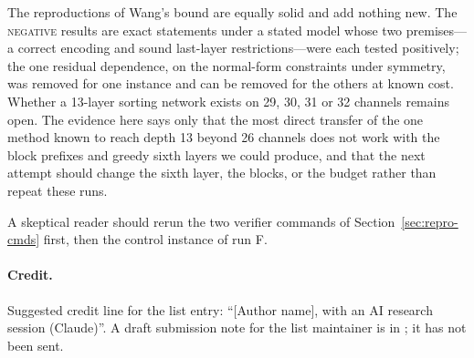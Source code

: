 \documentclass[11pt,a4paper]{article}
\theoremstyle{plain}
\theoremstyle{definition}
\theoremstyle{remark}
\newcommand{\NEG}{\textsc{negative}}
\begin{document}
The reproductions of Wang's bound are equally solid and add nothing new. The \NEG{} results are exact statements under a stated model whose two premises---a correct encoding and sound last-layer restrictions---were each tested positively; the one residual dependence, on the normal-form constraints under symmetry, was removed for one instance and can be removed for the others at known cost. Whether a 13-layer sorting network exists on 29, 30, 31 or 32 channels remains open. The evidence here says only that the most direct transfer of the one method known to reach depth 13 beyond 26 channels does not work with the block prefixes and greedy sixth layers we could produce, and that the next attempt should change the sixth layer, the blocks, or the budget rather than repeat these runs.

A skeptical reader should rerun the two verifier commands of Section~\ref{sec:repro-cmds} first, then the control instance of run F.

\paragraph{Credit.} Suggested credit line for the list entry: ``[Author name], with an AI research session (Claude)''. A draft submission note for the list maintainer is in ; it has not been sent.
\end{document}
